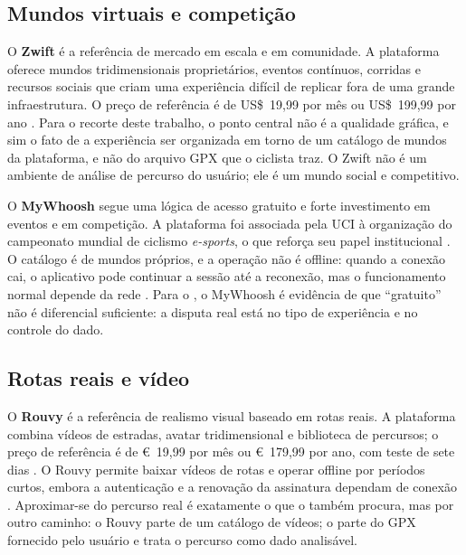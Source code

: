 \subsection{Mundos virtuais e competição}
\label{sec:mundos-virtuais}

O \textbf{Zwift} é a referência de mercado em escala e em comunidade. A
plataforma oferece mundos tridimensionais proprietários, eventos contínuos,
corridas e recursos sociais que criam uma experiência difícil de replicar fora
de uma grande infraestrutura. O preço de referência é de US\$~19,99 por mês ou
US\$~199,99 por ano \cite{zwift_pricing}. Para o recorte deste trabalho, o ponto
central não é a qualidade gráfica, e sim o fato de a experiência ser organizada
em torno de um catálogo de mundos da plataforma, e não do arquivo GPX que o
ciclista traz. O Zwift não é um ambiente de análise de percurso do usuário; ele
é um mundo social e competitivo.

O \textbf{MyWhoosh} segue uma lógica de acesso gratuito e forte investimento em
eventos e em competição. A plataforma foi associada pela UCI à organização do
campeonato mundial de ciclismo \textit{e-sports}, o que reforça seu papel
institucional \cite{uci2026,mywhoosh_site}. O catálogo é de mundos próprios, e a
operação não é offline: quando a conexão cai, o aplicativo pode continuar a
sessão até a reconexão, mas o funcionamento normal depende da rede
\cite{mywhoosh_offline}. Para o \argus{}, o MyWhoosh é evidência de que
``gratuito'' não é diferencial suficiente: a disputa real está no tipo de
experiência e no controle do dado.

\subsection{Rotas reais e vídeo}
\label{sec:rotas-reais}

O \textbf{Rouvy} é a referência de realismo visual baseado em rotas reais. A
plataforma combina vídeos de estradas, avatar tridimensional e biblioteca de
percursos; o preço de referência é de €~19,99 por mês ou €~179,99 por ano, com
teste de sete dias \cite{rouvy_pricing}. O Rouvy permite baixar vídeos de rotas
e operar offline por períodos curtos, embora a autenticação e a renovação da
assinatura dependam de conexão \cite{rouvy_offline}. Aproximar-se do percurso
real é exatamente o que o \argus{} também procura, mas por outro caminho: o
Rouvy parte de um catálogo de vídeos; o \argus{} parte do GPX fornecido pelo
usuário e trata o percurso como dado analisável.

